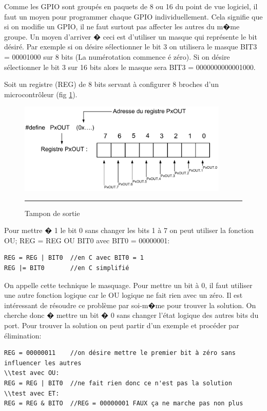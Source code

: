 Comme les GPIO sont groupés en paquets de 8 ou 16 du point de vue logiciel, il faut un moyen pour programmer chaque GPIO individuellement. Cela signifie que si on modifie un GPIO, il ne faut surtout pas affecter les autres du m�me groupe. Un moyen d'arriver � ceci est d'utiliser un masque qui représente le bit désiré. Par exemple si on désire sélectionner le bit 3 on utilisera le masque BIT3 = 00001000 sur 8 bits (La numérotation commence é zéro). Si on désire sélectionner le bit 3 sur 16 bits alors le masque sera BIT3 = 0000000000001000.

Soit un registre (REG) de 8 bits servant à configurer 8 broches d'un microcontrôleur (fig \ref{fig:pxout}). 

\begin{figure}[htb]
  \centering
  \includegraphics[angle=0, width=10cm]{./Figures/gpio/PxOUT.pdf}
  \rule{35em}{0.5pt}
  \caption[buff out]{Tampon de sortie}
  \label{fig:pxout}
\end{figure}

Pour mettre � 1 le bit 0 sans changer les bits 1 à 7 on peut utiliser la fonction OU; REG = REG OU BIT0 avec BIT0 = 00000001:

\lstset{style=customc}
\begin{lstlisting}
REG = REG | BIT0  //en C avec BIT0 = 1
REG |= BIT0		  //en C simplifié
\end{lstlisting}

On appelle cette technique le masquage. Pour mettre un bit à 0, il faut utiliser une autre fonction logique car le OU logique ne fait rien avec un zéro. Il est intéressant de résoudre ce problème par soi-m�me pour trouver la solution. On cherche donc � mettre un bit � 0 sans changer l'état logique des autres bits du port. Pour trouver la solution on peut partir d'un exemple et procéder par élimination:

\lstset{style=customc}
\begin{lstlisting}
REG = 00000011    //on désire mettre le premier bit à zéro sans influencer les autres
\\test avec OU:
REG = REG | BIT0  //ne fait rien donc ce n'est pas la solution
\\test avec ET:
REG = REG & BITO  //REG = 00000001 FAUX ça ne marche pas non plus
\end{lstlisting}


